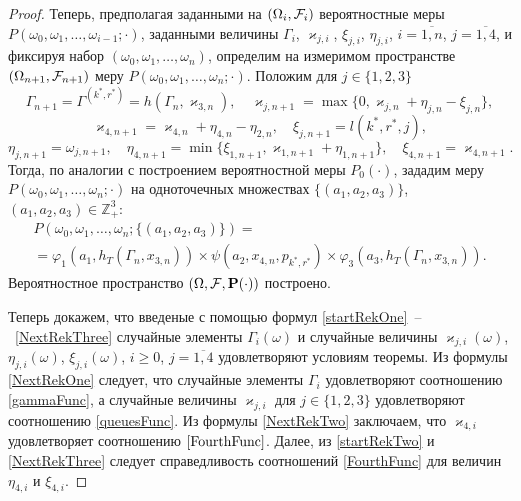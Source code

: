 \documentclass[a4paper,12pt,russian]{extarticle}
\newcommand{\ml}[1]{\begin{multline}#1\end{multline}}
\begin{document}
\begin{proof}
Теперь, предполагая заданными на $(\Omega_i, {\cal F}_i)$ вероятностные меры $P(\omega_0, \omega_1, \ldots, \omega_{i-1};\cdot)$, заданными величины $\Gamma_i$, $\varkappa_{j,i}$, $\xi_{j,i}$, $\eta_{j,i}$, $i=\overline{1,n}$, $j=\overline{1,4}$, и фиксируя набор $(\omega_0, \omega_1, \ldots, \omega_{n})$, определим на измеримом пространстве $(\Omega_{n+1}, {\cal F}_{n+1})$ меру $P(\omega_0, \omega_1, \ldots, \omega_n;\cdot)$. Положим для $j\in \{1, 2, 3\}$
\begin{equation}
\Gamma_{n+1}=\Gamma^{(k^*,r^*)}=h(\Gamma_{n},\varkappa_{3,n}), \quad \varkappa_{j,n+1}=\max\{ 0,\varkappa_{j,n}+\eta_{j,n} -\xi_{j,n}\},
\label{NextRekOne}
\end{equation}
\begin{equation}
\varkappa_{4,n+1}=\varkappa_{4,n}+\eta_{4,n}-\eta_{2,n}, \quad \xi_{j,n+1}=l(k^*,r^*,j),
\label{NextRekTwo}
\end{equation}
\begin{equation}
\eta_{j,n+1}=\omega_{j,n+1}, \quad \eta_{4,n+1}=\min\{\xi_{1,n+1}, \varkappa_{1,n+1}+\eta_{1,n+1}\}, \quad \xi_{4,n+1}=\varkappa_{4,n+1}.
\label{NextRekThree}
\end{equation}
Тогда, по аналогии с построением вероятностной меры $P_0(\cdot)$, зададим меру $P(\omega_0,\omega_1,\ldots,\omega_n;\cdot)$ на одноточечных множествах $\{(a_1,a_2,a_3)\}$, $(a_1,a_2,a_3)\in {\mathbb Z}_+^3$:
\ml
{
P(\omega_0,\omega_1,\ldots,\omega_n;\{(a_1,a_2,a_3)\}) = \\
= \varphi_1(a_1,h_T(\Gamma_n,x_{3,n})) \times \psi(a_2,x_{4,n}, p_{k^*,r^*}) \times \varphi_3(a_3,h_T(\Gamma_n,x_{3,n})).
\label{probabilitiesTwo}
}
Вероятностное пространство $(\Omega,{\cal F},\Pr(\cdot))$ построено. 

Теперь докажем, что введеные с помощью формул \eqref{startRekOne}~--~\eqref{NextRekThree} случайные элементы $\Gamma_i(\omega)$ и случайные величины $\varkappa_{j,i}(\omega)$, $\eta_{j,i}(\omega)$, $\xi_{j,i}(\omega)$, $i \geqslant 0$, $j =\overline{1,4}$ удовлетворяют условиям теоремы. Из формулы \eqref{NextRekOne} следует, что случайные элементы $\Gamma_i$ удовлетворяют соотношению \eqref{gammaFunc}, а случайные величины $\varkappa_{j,i}$ для $j\in \{1, 2, 3\}$ удовлетворяют соотношению \eqref{queuesFunc}. Из формулы \eqref{NextRekTwo} заключаем, что $\varkappa_{4,i}$ удовлетворяет соотношению $\eqref{FourthFunc}$. Далее, из \eqref{startRekTwo} и \eqref{NextRekThree} следует справедливость соотношений \eqref{FourthFunc} для величин $\eta_{4,i}$ и $\xi_{4,i}$. 


\end{proof}
\end{document}
